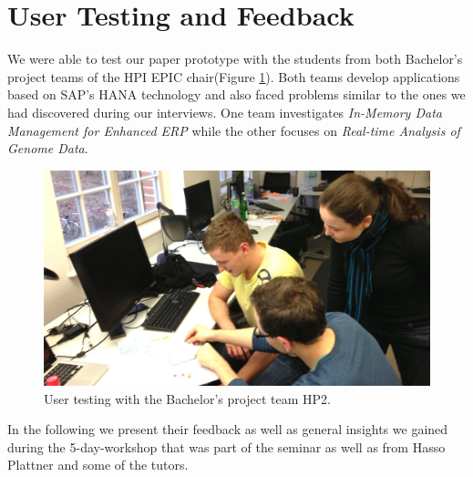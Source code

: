 
\section[User Testing and Feedback (Author: Thomas B\"unger)]{User Testing and Feedback}
\label{sec:USER_TESTING}

We were able to test our paper prototype with the students from both Bachelor's project teams of the HPI EPIC chair(Figure \ref{fig:user_testing}). Both teams develop applications based on SAP's HANA technology and also faced problems similar to the ones we had discovered during our interviews. One team investigates \emph{In-Memory Data Management for Enhanced ERP} while the other focuses on \emph{Real-time Analysis of Genome Data}.

\begin{figure}
\begin{centering}
    \includegraphics[width=1.0\linewidth]{images/user_testing}
    \caption{User testing with the Bachelor's project team HP2.}
    \label{fig:user_testing}
\end{centering}
\end{figure}

In the following we present their feedback as well as general insights we gained during the 5-day-workshop that was part of the seminar as well as from Hasso Plattner and some of the tutors.

